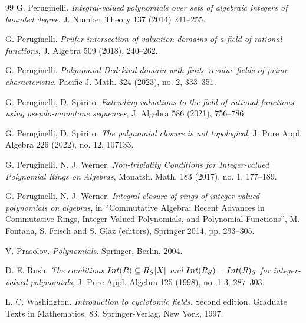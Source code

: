 \documentclass{article}
\theoremstyle{definition}\newtheorem{Def}[equation]{Definition}
\theoremstyle{definition}\newtheorem{Ques}[equation]{Question}
\theoremstyle{definition}\newtheorem{Conj}[equation]{Conjecture}
\theoremstyle{definition}\newtheorem{Not}[equation]{Notation}
\newcommand{\Int}{\textnormal{Int}}
\numberwithin{equation}{section}
\begin{document}
\begin{thebibliography}{99}
 G. Peruginelli. \emph{Integral-valued polynomials over sets of algebraic integers of bounded degree}. J. Number Theory 137 (2014) 241--255.

 G. Peruginelli. \emph{Pr\"ufer intersection of valuation domains of a field of rational functions}, J. Algebra 509 (2018), 240--262.


 G. Peruginelli. \emph{Polynomial Dedekind domain with finite residue fields of prime characteristic}, Pacific J. Math. 324 (2023), no. 2, 333--351.


 G. Peruginelli, D. Spirito. \emph{Extending valuations to the field of rational functions using pseudo-monotone sequences},  J. Algebra 586 (2021), 756--786.

 G. Peruginelli, D. Spirito. \emph{The polynomial closure is not topological},  J. Pure Appl. Algebra 226 (2022), no. 12, 107133.

 G. Peruginelli, N. J. Werner. \emph{Non-triviality Conditions for Integer-valued Polynomial Rings on Algebras}, Monatsh. Math. 183 (2017), no. 1, 177--189. 

 G. Peruginelli, N. J. Werner. \emph{Integral closure of rings of integer-valued polynomials on algebras}, in ``Commutative Algebra: Recent Advances in Commutative Rings, Integer-Valued Polynomials, and Polynomial Functions'', M. Fontana, S. Frisch and S. Glaz (editors), Springer 2014, pp. 293--305.

 V. Prasolov. \emph{Polynomials}. Springer, Berlin, 2004.

 D. E. Rush. \emph{The conditions $\Int(R)\subseteq R_S[X]$ and $\Int(R_S)=\Int(R)_S$ for integer-valued polynomials}, 
J. Pure Appl. Algebra 125 (1998), no. 1-3, 287--303.

 L. C. Washington. \emph{Introduction to cyclotomic fields}. Second edition. Graduate Texts in Mathematics, 83. Springer-Verlag, New York, 1997.
\end{thebibliography}
\end{document}
